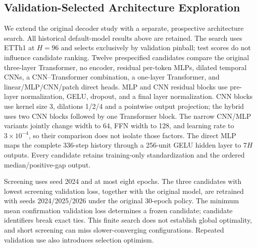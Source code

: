 \subsection{Validation-Selected Architecture Exploration}

\label{sec:architecture-search}

We extend the original decoder study with a separate, prospective architecture search. All historical default-model results above are retained. The search uses ETTh1 at $H=96$ and selects exclusively by validation pinball; test scores do not influence candidate ranking. Twelve prespecified candidates compare the original three-layer Transformer, no encoder, residual per-token MLPs, dilated temporal CNNs, a CNN--Transformer combination, a one-layer Transformer, and linear/MLP/CNN/patch direct heads. MLP and CNN residual blocks use pre-layer normalization, GELU, dropout, and a final layer normalization. CNN blocks use kernel size 3, dilations 1/2/4 and a pointwise output projection; the hybrid uses two CNN blocks followed by one Transformer block. The narrow CNN/MLP variants jointly change width to 64, FFN width to 128, and learning rate to $3\times10^{-4}$, so their comparison does not isolate those factors. The direct MLP maps the complete 336-step history through a 256-unit GELU hidden layer to $7H$ outputs. Every candidate retains training-only standardization and the ordered median/positive-gap output.

Screening uses seed 2024 and at most eight epochs. The three candidates with lowest screening validation loss, together with the original model, are retrained with seeds 2024/2025/2026 under the original 30-epoch policy. The minimum mean confirmation validation loss determines a frozen candidate; candidate identifiers break exact ties. This finite search does not establish global optimality, and short screening can miss slower-converging configurations. Repeated validation use also introduces selection optimism.

